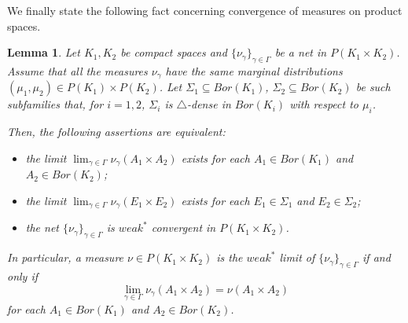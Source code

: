 \documentclass[12pt,fleqn]{amsart}
\numberwithin{equation}{section}
\newtheorem{lemma}[thm]{Lemma}
\theoremstyle{definition}
\begin{document}
We finally state the following fact concerning convergence of measures on product spaces.

\begin{lemma}
\label{rectangles}
Let $K_1, K_2$ be compact spaces and $\{ \nu_{\gamma} \}_{\gamma \in \Gamma}$ be a net in $P(K_1 \times K_2)$. Assume that all the measures $\nu_{\gamma}$ have the same marginal distributions $(\mu_1,\mu_2)\in P(K_1)\times P(K_2)$.
Let $\Sigma_1\subseteq Bor(K_1)$, $\Sigma_2\subseteq Bor(K_2)$ be such subfamilies that, for $i=1, 2$, $\Sigma_i$ is $\bigtriangleup$-dense in $Bor(K_i)$ with respect to $\mu_i$. 

Then, the following assertions are equivalent:
\begin{itemize}
    \item[(i)] the limit $\lim_{\gamma \in \Gamma} \nu_{\gamma}(A_1 \times A_2)$ exists for each $A_1 \in Bor(K_1)$ and $A_2 \in Bor(K_2)$;
    \item[(ii)] the limit $\lim_{\gamma \in \Gamma} \nu_{\gamma}(E_1 \times E_2)$ exists for each $E_1 \in \Sigma_1$ and $E_2 \in \Sigma_2$;
     \item[(iii)] the net $\{ \nu_{\gamma} \}_{\gamma \in \Gamma}$ is $weak^\ast$ convergent in $P(K_1 \times K_2)$.
\end{itemize}
In particular, a measure $\nu\in P(K_1\times K_2)$ is the $weak^\ast$ limit of $\{\nu_\gamma\}_{\gamma\in\Gamma}$ if and only if
\[\lim_{\gamma\in\Gamma}\nu_\gamma(A_1 \times A_2)=\nu(A_1\times A_2)\]
for each $A_1 \in Bor(K_1)$ and $A_2 \in Bor(K_2)$. %
\end{lemma}
\end{document}
